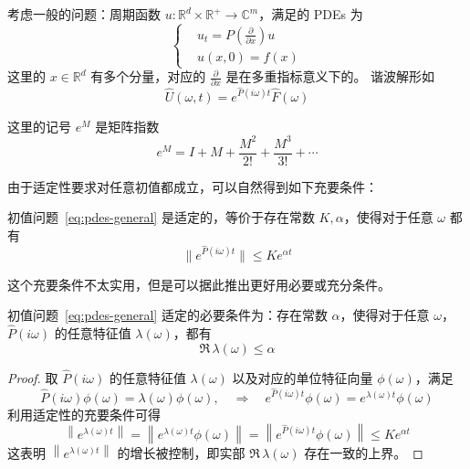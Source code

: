 考虑一般的问题：周期函数 $u: \mathbb{R}^d  \times \mathbb{R}^+ \to \mathbb{C}^{m}$，满足的 PDEs 为
\begin{equation}
    \left\{
    \begin{aligned}
         & u_t = P(\frac{\partial}{\partial x}) u \\
         & u(x,0) = f(x)
    \end{aligned}
    \right.
    \label{eq:pdes-general}
\end{equation}
这里的 $x \in \mathbb{R}^d$ 有多个分量，对应的 $\frac{\partial}{\partial x}$ 是在多重指标意义下的。
谐波解形如
\[
    \widehat{U}(\omega ,t) = e^{\widehat{P}(i \omega )t} \widehat{F}(\omega )
\]

\begin{remark}
    这里的记号 $e^M$ 是矩阵指数
    \[
        e^M = I + M + \frac{M^2}{2!} + \frac{M^3}{3!} + \cdots
    \]
\end{remark}

由于适定性要求对任意初值都成立，可以自然得到如下充要条件：
\begin{theorem}
    初值问题~\eqref{eq:pdes-general} 是适定的，等价于存在常数 $K,\alpha$，使得对于任意 $\omega $ 都有
    \[
        \| e^{\widehat{P}(i \omega )t} \| \le K e^{\alpha t}
    \]
\end{theorem}

这个充要条件不太实用，但是可以据此推出更好用必要或充分条件。
\begin{theorem}
    初值问题~\eqref{eq:pdes-general} 适定的必要条件为：存在常数 $\alpha$，使得对于任意 $\omega $，$\widehat{P}(i \omega)$ 的任意特征值 $\lambda(\omega )$，都有
    \[
        \Re\, \lambda(\omega ) \le \alpha
    \]
\end{theorem}

\begin{proof}
    取 $\widehat{P}(i \omega)$ 的任意特征值 $\lambda(\omega )$ 以及对应的单位特征向量 $\phi(\omega )$，满足
    \[
        \widehat{P}(i \omega) \phi(\omega ) = \lambda(\omega ) \phi(\omega ),\quad \Rightarrow \quad e^{\widehat{P}(i \omega)t} \phi(\omega ) = e^{\lambda(\omega )t} \phi(\omega )
    \]
    利用适定性的充要条件可得
    \[
        \left\|e^{\lambda(\omega )t}\right\|  = \left\|e^{\lambda(\omega )t} \phi(\omega ) \right\|
        = \left\| e^{\widehat{P}(i \omega)t} \phi(\omega )\right\| \le K e^{\alpha t}
    \]
    这表明 $\left\|e^{\lambda(\omega )t}\right\|$ 的增长被控制，即实部 $\Re\, \lambda(\omega )$ 存在一致的上界。
\end{proof}

